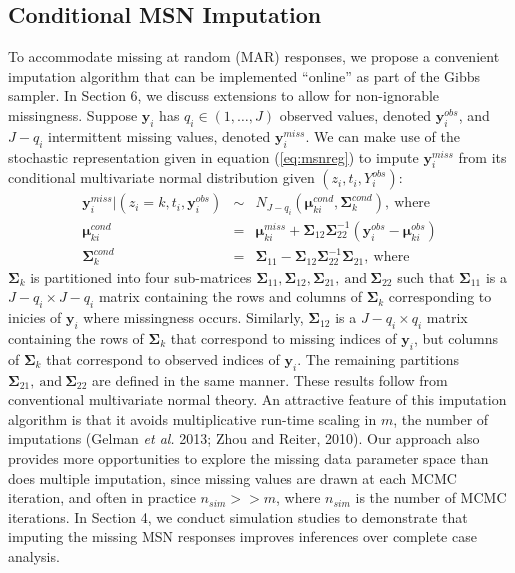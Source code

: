 \documentclass[useAMS,referee]{biom}
\begin{document}
\subsection{Conditional MSN Imputation}
To accommodate missing at random (MAR) responses, we propose a convenient imputation algorithm that can be implemented ``online'' as part of the Gibbs sampler. In Section 6, we discuss extensions to allow for non-ignorable missingness. Suppose $\mathbf{y}_i$ has $q_i\in (1,\ldots,J)$ observed values, denoted $\mathbf{y}^{obs}_i$, and $J-q_i$ intermittent missing values, denoted $\mathbf{y}^{miss}_i$. We can make use of the stochastic representation given in equation (\ref{eq:msnreg}) to impute $\mathbf{y}^{miss}_i$ from its conditional multivariate normal distribution given $(z_i,t_i,Y^{obs}_i)$:
\begin{eqnarray}
\mathbf{y}^{miss}_i|(z_i=k,t_i,\mathbf{y}^{obs}_i)&\sim& N_{J-q_i}(\boldsymbol\mu^{cond}_{ki},\boldsymbol\Sigma^{cond}_k),~\text{where}\nonumber\\
\boldsymbol\mu^{cond}_{ki}&=& \boldsymbol\mu^{miss}_{ki} + \boldsymbol\Sigma_{12} \boldsymbol\Sigma_{22}^{-1}(\mathbf{y}^{obs}_i - \boldsymbol\mu^{obs}_{ki}) \label{eq:impute}\\
\boldsymbol\Sigma^{cond}_k&=& \boldsymbol\Sigma_{11} - \boldsymbol\Sigma_{12}\boldsymbol\Sigma_{22}^{-1}\boldsymbol\Sigma_{21},~\text{where}\nonumber
\end{eqnarray}
$\boldsymbol\Sigma_k$ is partitioned into four sub-matrices $\boldsymbol\Sigma_{11},\boldsymbol\Sigma_{12},\boldsymbol\Sigma_{21}, \ \text{and} \ \boldsymbol\Sigma_{22}$ such that $\boldsymbol\Sigma_{11}$ is a $J-q_i \times J-q_i$ matrix containing the rows and columns of $\boldsymbol\Sigma_k$ corresponding to inicies of $\mathbf{y}_{i}$ where missingness occurs. Similarly, $\boldsymbol\Sigma_{12}$ is a $J-q_i \times q_i$ matrix containing the rows of $\boldsymbol\Sigma_k$ that correspond to missing indices of $\mathbf{y}_i$, but columns of $\boldsymbol\Sigma_k$ that correspond to observed indices of $\mathbf{y}_i$. The remaining partitions $\boldsymbol\Sigma_{21}, \ \text{and} \ \boldsymbol\Sigma_{22}$ are defined in the same manner. These results follow from conventional multivariate normal theory. An attractive feature of this imputation algorithm is that it avoids multiplicative run-time scaling in $m$, the number of imputations (Gelman \textit{et al.} 2013; Zhou and Reiter, 2010). Our approach also provides more opportunities to explore the missing data parameter space than does multiple imputation, since missing values are drawn at each MCMC iteration, and often in practice $n_{sim} >> m$, where $n_{sim}$ is the number of MCMC iterations. In Section 4, we conduct simulation studies to demonstrate that imputing the missing MSN responses improves inferences over complete case analysis.
\end{document}
